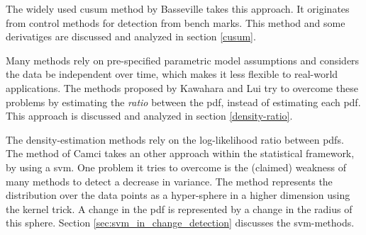 The widely used \gls{cusum} method by Basseville \etal \cite{basseville1993detection} takes this approach.
It originates from control methods for detection from bench marks.
This method and some derivatiges are discussed and analyzed in section \ref{cusum}.

Many methods rely on pre-specified parametric model assumptions and considers the data be independent over time, which makes it less flexible to real-world applications.
The methods proposed by Kawahara \etal \cite{kawahara2009change} and Lui \etal \cite{liu2013change} try to overcome these problems by estimating the \emph{ratio} between the \gls{pdf}, instead of estimating each \gls{pdf}.
This approach is discussed and analyzed in section \ref{density-ratio}.

The density-estimation methods rely on the log-likelihood ratio between \glspl{pdf}.
The method of Camci \cite{camci2010change} takes an other approach within the statistical framework, by using a \gls{svm}.
One problem it tries to overcome is the (claimed) weakness of many methods to detect a decrease in variance.
The method represents the distribution over the data points as a hyper-sphere in a higher dimension using the kernel trick.
A change in the \gls{pdf} is represented by a change in the radius of this sphere.
Section \ref{sec:svm_in_change_detection} discusses the \gls{svm}-methods.













% 
